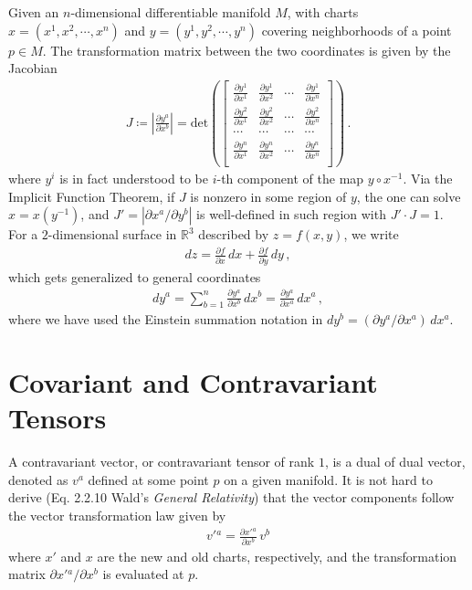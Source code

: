 \documentclass[11pt, onesided]{book}
\theoremstyle{break}
\theoremstyle{break}
\newcommand{\R}{\mathbb{R}}
\newcommand{\pd}{\partial}
\newcommand{\bmat}[1]{\begin{bmatrix} #1 \end{bmatrix}}
\newcommand{\txt}{Wald's \textit{General Relativity}}
\begin{document}
Given an $n$-dimensional differentiable manifold $M$, with charts $x=(x^1,x^2,\cdots, x^n)$ and $y=(y^1,y^2,\cdots, y^n)$ covering neighborhoods of a point $p \in M$. The transformation matrix between the two coordinates is given by the Jacobian
\begin{align*}
J \coloneqq
\left|\frac{\pd y^a}{\pd x^b}\right| = \text{det}\left(\bmat{
\frac{\pd y^1}{\pd x^1} & \frac{\pd y^1}{\pd x^2} & \cdots & \frac{\pd y^1}{\pd x^n}\\
\frac{\pd y^2}{\pd x^1} & \frac{\pd y^2}{\pd x^2} & \cdots & \frac{\pd y^2}{\pd x^n}\\
\cdots & \cdots & \cdots & \cdots  \\
\frac{\pd y^n}{\pd x^1} & \frac{\pd y^n}{\pd x^2} & \cdots & \frac{\pd y^n}{\pd x^n}\\ }\right)\,.
\end{align*}
where $y^i$ is in fact understood to be $i$-th component of the map $y\circ x^{-1}$. Via the Implicit Function Theorem, if $J$ is nonzero in some region of $y$, the one can solve $x = x(y^{-1})$, and $J' = |\pd x^a / \pd y^b|$ is well-defined in such region with $J'\cdot J = 1$. \\

For a $2$-dimensional surface in $\R^3$ described by $z = f(x,y)$, we write 
\begin{align*}
dz = \frac{\pd f}{\pd x} \, dx + \frac{\pd f}{\pd y}\, dy\,,
\end{align*}
which gets generalized to general coordinates
\begin{align*}
dy^a = \sum_{b=1}^n  \frac{\pd y^a}{\pd x^b}\, dx^b =\frac{\pd y^a}{\pd x^a}\, dx^a \,,
\end{align*}
where we have used the Einstein summation notation in $dy^b  = (\pd y^a/ \pd x^a)\, dx^a$. 

\section[Covariant and Contravariant Tensors]{\color{red}Covariant and Contravariant Tensors\color{black}}
A contravariant vector, or contravariant tensor of rank $1$, is a dual of dual vector, denoted as $v^a$ defined at some point $p$ on a given manifold. It is not hard to derive (Eq. 2.2.10 \txt) that the vector components follow the vector transformation law given by
\begin{align*}
v'{}^a = \frac{\pd x'{}^a}{\pd x^b}\, v^b
\end{align*}
where $x'$ and $x$ are the new and old charts, respectively, and the transformation matrix ${\pd x'{}^a}/\pd x^b$ is evaluated at $p$.\\
\end{document}
